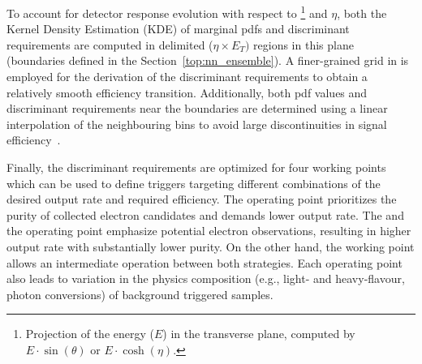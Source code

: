 To account for detector response evolution with
respect to \Et\footnote{Projection of the energy ($E$) in the transverse plane,
computed by $E\cdot\sin(\theta)$ or $E\cdot\cosh(\eta)$.} and
$\eta$, both the Kernel Density Estimation (KDE) of marginal pdfs  and discriminant requirements are computed in delimited ($\eta\times E_{T})$
regions in this plane (boundaries defined in the Section~\ref{top:nn_ensemble}).
A finer-grained grid in \Et is employed for the derivation of the discriminant
requirements to obtain a relatively smooth efficiency transition. Additionally,
both pdf values and discriminant requirements near the boundaries are determined
using a linear interpolation of the neighbouring bins to avoid large
discontinuities in signal efficiency~\cite{aaboud2019electron}.

Finally, the discriminant requirements are optimized for four working points
which can be used to define triggers targeting different combinations of the desired output rate
and required efficiency. The \tight{} operating point prioritizes the purity of
collected electron candidates and demands lower output rate.
The \loose{} and the \vloose{} operating point emphasize potential electron observations, resulting in higher output rate with substantially lower purity. 
On the other hand, the \medium{} working point allows an intermediate
operation between both strategies. Each operating point also leads to
variation in the physics composition (e.g., light- and heavy-flavour, photon
conversions) of background triggered samples. 








